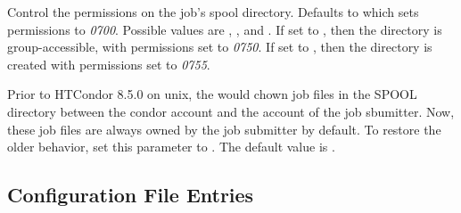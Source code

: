 \begin{description}
\label{param:JobSpoolPermissions}
\item[\Macro{JOB\_SPOOL\_PERMISSIONS}]
  Control the permissions on the job's spool directory. Defaults to
   which sets permissions to \emph{0700}. Possible values are
  , , and .
  If set to , then the directory is group-accessible,
  with permissions set to \emph{0750}.
  If set to ,
  then the directory is created with permissions set to \emph{0755}.

\label{param:ChownJobSpoolFiles}
\item[\Macro{CHOWN\_JOB\_SPOOL\_FILES}]
  Prior to HTCondor 8.5.0 on unix, the  would chown job
  files in the SPOOL directory between the condor account and the
  account of the job sbumitter.
  Now, these job files are always owned by the job submitter by default.
  To restore the older behavior, set this parameter to .
  The default value is .

\end{description}
\subsection{\label{sec:Shadow-Config-File-Entries}
Configuration File Entries}

